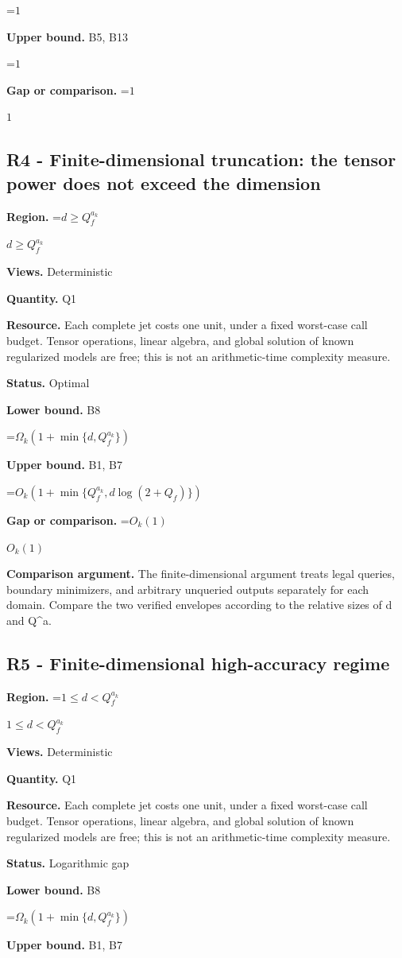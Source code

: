 \documentclass[10pt,a4paper]{article}
\newcommand{\AtlasMath}[1]{\par\begingroup\centering\setbox0=\hbox{$\displaystyle #1$}\ifdim\wd0>1.4\linewidth\typeout{ATLAS WIDE FORMULA: \the\wd0}\fi\ifdim\wd0>\linewidth\resizebox{\linewidth}{!}{\box0}\else\box0\fi\par\endgroup}
\newcommand{\AtlasInlineMath}[1]{\begingroup\setbox0=\hbox{$#1$}\ifdim\wd0>.4\linewidth\endgroup\AtlasMath{#1}\else\endgroup$#1$\fi}
\begin{document}
\AtlasMath{1}
\textbf{Upper bound.} B5, B13

\AtlasMath{1}
\textbf{Gap or comparison.} \AtlasInlineMath{1}

\subsection{R4 - Finite-dimensional truncation: the tensor power does not exceed the dimension}
\textbf{Region.} \AtlasInlineMath{d\ge Q_f^{a_k}}

\textbf{Views.} Deterministic

\textbf{Quantity.} Q1

\textbf{Resource.} Each complete jet costs one unit, under a fixed worst-case call budget. Tensor operations, linear algebra, and global solution of known regularized models are free; this is not an arithmetic-time complexity measure.

\textbf{Status.} Optimal

\textbf{Lower bound.} B8

\AtlasMath{\Omega_k(1+\min\{d,Q_f^{a_k}\})}
\textbf{Upper bound.} B1, B7

\AtlasMath{O_k(1+\min\{Q_f^{a_k},d\log(2+Q_f)\})}
\textbf{Gap or comparison.} \AtlasInlineMath{O_k(1)}

\textbf{Comparison argument.} The finite-dimensional argument treats legal queries, boundary minimizers, and arbitrary unqueried outputs separately for each domain. Compare the two verified envelopes according to the relative sizes of d and Q\textasciicircum{}a.

\subsection{R5 - Finite-dimensional high-accuracy regime}
\textbf{Region.} \AtlasInlineMath{1\le d<Q_f^{a_k}}

\textbf{Views.} Deterministic

\textbf{Quantity.} Q1

\textbf{Resource.} Each complete jet costs one unit, under a fixed worst-case call budget. Tensor operations, linear algebra, and global solution of known regularized models are free; this is not an arithmetic-time complexity measure.

\textbf{Status.} Logarithmic gap

\textbf{Lower bound.} B8

\AtlasMath{\Omega_k(1+\min\{d,Q_f^{a_k}\})}
\textbf{Upper bound.} B1, B7
\end{document}
